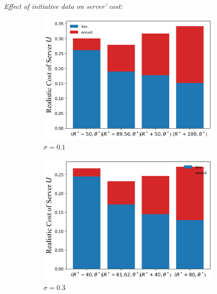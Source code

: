 \documentclass{article}
\theoremstyle{plain}
\theoremstyle{definition}
\theoremstyle{remark}
\begin{document}
\textit{Effect of initiative data on server' cost:}
\begin{figure}
	\begin{subfigure}{0.31\textwidth}
		\centering
    \includegraphics[width=\textwidth]{figures/figure_75_A.png}
    \caption{$\sigma=0.1$}
	\end{subfigure}
  \quad
	\begin{subfigure}{0.31\textwidth}
		\centering
		\includegraphics[width=\textwidth]{figures/figure_75_B.png}
    \caption{$\sigma=0.3$}
	\end{subfigure}
  \quad
  \begin{subfigure}{0.31\textwidth}
		\centering

\end{subfigure}
\end{figure}
\end{document}
